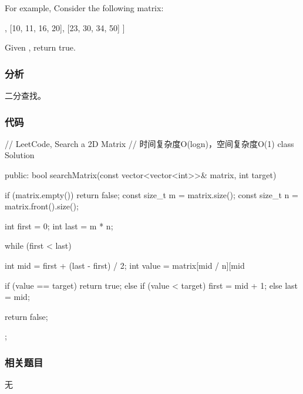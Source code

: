 For example, Consider the following matrix:
\begin{Code}
[
  [1,   3,  5,  7],
  [10, 11, 16, 20],
  [23, 30, 34, 50]
]
\end{Code}
Given , return true.


\subsubsection{分析}
二分查找。


\subsubsection{代码}
\begin{Code}
// LeetCode, Search a 2D Matrix
// 时间复杂度O(logn)，空间复杂度O(1)
class Solution {
public:
    bool searchMatrix(const vector<vector<int>>& matrix, int target) {
        if (matrix.empty()) return false;
        const size_t  m = matrix.size();
        const size_t n = matrix.front().size();

        int first = 0;
        int last = m * n;

        while (first < last) {
            int mid = first + (last - first) / 2;
            int value = matrix[mid / n][mid %

            if (value == target)
                return true;
            else if (value < target)
                first = mid + 1;
            else
                last = mid;
        }

        return false;
    }
};
\end{Code}


\subsubsection{相关题目}
\begindot
\item 无
\myenddot
